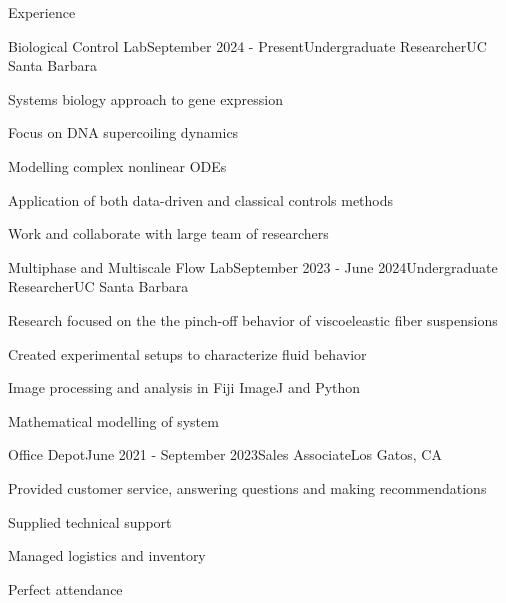\documentclass[
	11pt, %
]{resume} %
\begin{document}
\begin{rSection}{Experience}

	\begin{rSubsection}{Biological Control Lab}{September 2024 - Present}{Undergraduate Researcher}{UC Santa Barbara}
		\item Systems biology approach to gene expression
		\item Focus on DNA supercoiling dynamics
		\item Modelling complex nonlinear ODEs
		\item Application of both data-driven and classical controls methods
		\item Work and collaborate with large team of researchers
	\end{rSubsection}


	\begin{rSubsection}{Multiphase and Multiscale Flow Lab}{September 2023 - June 2024}{Undergraduate Researcher}{UC Santa Barbara}
		\item Research focused on the the pinch-off behavior of viscoeleastic fiber suspensions
		\item Created experimental setups to characterize fluid behavior
		\item Image processing and analysis in Fiji ImageJ and Python
		\item Mathematical modelling of system
	\end{rSubsection}


	\begin{rSubsection}{Office Depot}{June 2021 - September 2023}{Sales Associate}{Los Gatos, CA}
		\item Provided customer service, answering questions and making recommendations
		\item Supplied technical support 
		\item Managed logistics and inventory
		\item Perfect attendance
	\end{rSubsection}

\end{rSection}

\end{document}
